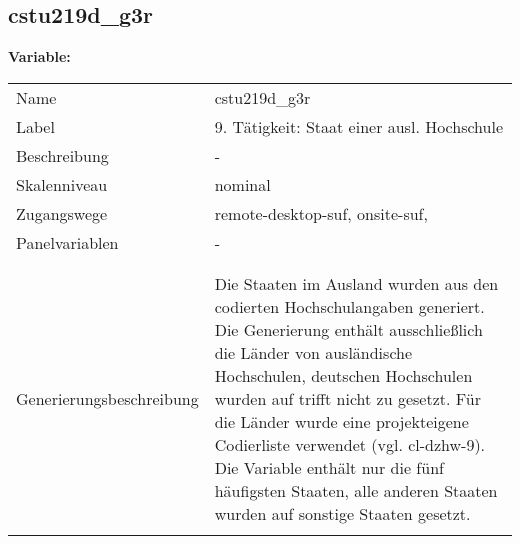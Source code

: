 	
	
	\subsection{cstu219d\_g3r}
	\label{subSection:cstu219d_g3r}

	\noindent\textbf{Variable:}\\
		\begin{tabular}{lL{11.3cm}}
			\label{tableVariable:cstu219d_g3r}
			Name & cstu219d\_g3r \\
			Label & 9. Tätigkeit: Staat einer ausl. Hochschule \\
			Beschreibung & - \\
			Skalenniveau & nominal \\
			Zugangswege &
				remote-desktop-suf,
				onsite-suf,
 \\
			Panelvariablen & -
			 \\
			 \\
 \\
					Generierungsbeschreibung & Die Staaten im Ausland wurden aus den codierten Hochschulangaben generiert. Die Generierung enthält ausschließlich die Länder von ausländische Hochschulen, deutschen Hochschulen wurden auf trifft nicht zu gesetzt. Für die Länder wurde eine projekteigene Codierliste verwendet (vgl. cl-dzhw-9). Die Variable enthält nur die fünf häufigsten Staaten, alle anderen Staaten wurden auf sonstige Staaten gesetzt. 
				 \\	
			 \\
		\end{tabular}






